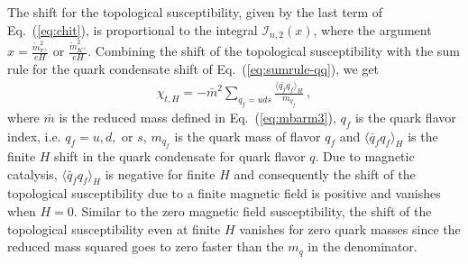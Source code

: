 \documentclass[12pt]{elsarticle}
\begin{document}
The shift for the topological susceptibility, given by the last term of Eq.~(\ref{eq:chit}), is proportional to the integral $\mathcal{I}_{n,2}(x)$, where the argument $x=\tfrac{\mathring{m}_{\pi^{\pm}}^{2}}{eH}$ or $\tfrac{\mathring{m}_{K^{\pm}}^{2}}{eH}$. Combining the shift of the topological susceptibility with the sum rule 
for the quark condensate shift of Eq.~(\ref{eq:sumrule-qq}), we get
\begin{align}
\label{eq:sumrule-chitH}
\chi_{t,H}=-\bar{m}^{2}\sum_{q_{f}=uds}\frac{\langle\bar{q_{f}}q_{f}\rangle_{H}}{m_{q_{f}}}\ ,
\end{align}
where $\bar{m}$ is the reduced mass defined in Eq.~(\ref{eq:mbarm3}), $q_{f}$ is the quark flavor index, i.e. $q_{f}=u,d,$ or $s$, $m_{q_{f}}$ is the quark mass of flavor $q_{f}$ and $\langle\bar{q}_{f}q_{f}\rangle_{H}$ is the finite $H$ shift in the quark condensate for quark flavor $q$.  Due to magnetic catalysis, $\langle\bar{q}_{f}q_{f}\rangle_{H}$ is negative for finite $H$ and consequently the shift of the topological susceptibility due to a finite magnetic field is positive and vanishes when $H=0$. Similar to the zero magnetic field susceptibility, the shift of the topological susceptibility even at finite $H$ vanishes for zero quark masses since the reduced mass squared goes to zero faster than the $m_{q}$ in the denominator.
\end{document}
